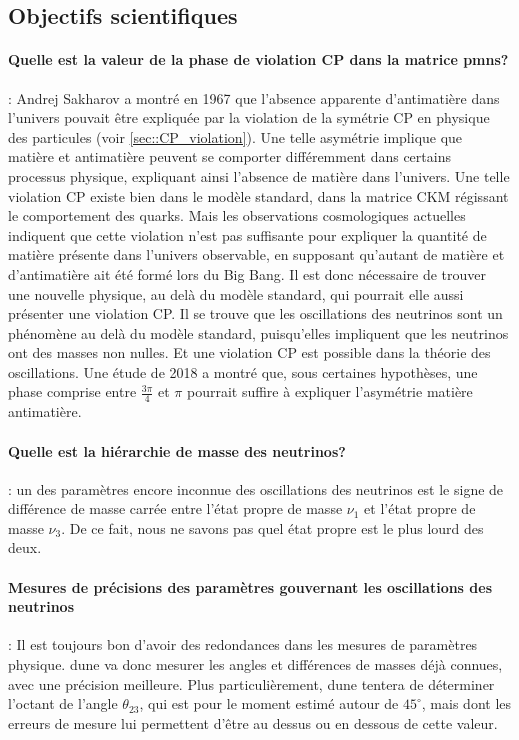         \subsection{Objectifs scientifiques}
        
            \paragraph{Quelle est la valeur de la phase de violation CP dans la matrice \gls{pmns}?} : Andrej Sakharov a montré en 1967\cite{Sakharov1967} que l'absence apparente d'antimatière dans l'univers pouvait être expliquée par la violation de la symétrie CP en physique des particules (voir \autoref{sec::CP_violation}). Une telle asymétrie implique que matière et antimatière peuvent se comporter différemment dans certains processus physique, expliquant ainsi l'absence de matière dans l'univers. Une telle violation CP existe bien dans le modèle standard, dans la matrice CKM régissant le comportement des quarks. Mais les observations cosmologiques actuelles\cite{Bari2012} indiquent que cette violation n'est pas suffisante pour expliquer la quantité de matière présente dans l'univers observable, en supposant qu'autant de matière et d'antimatière ait été formé lors du Big Bang. Il est donc nécessaire de trouver une nouvelle physique, au delà du modèle standard, qui pourrait elle aussi présenter une violation CP. Il se trouve que les oscillations des neutrinos sont un phénomène au delà du modèle standard, puisqu'elles impliquent que les neutrinos ont des masses non nulles. Et une violation CP est possible dans la théorie des oscillations. Une étude de 2018\cite{Bucella2018} a montré que, sous certaines hypothèses, une phase comprise entre $\frac{3\pi}{4}$ et $\pi$ pourrait suffire à expliquer l'asymétrie matière antimatière.
            
            \paragraph{Quelle est la hiérarchie de masse des neutrinos?} : un des paramètres encore inconnue des oscillations des neutrinos est le signe de différence de masse carrée entre l'état propre de masse $\nu_1$ et l'état propre de masse $\nu_3$. De ce fait, nous ne savons pas quel état propre est le plus lourd des deux.
            
            \paragraph{Mesures de précisions des paramètres gouvernant les oscillations des neutrinos} : Il est toujours bon d'avoir des redondances dans les mesures de paramètres physique. \gls{dune} va donc mesurer les angles et différences de masses déjà connues, avec une précision meilleure. Plus particulièrement, \gls{dune} tentera de déterminer l'octant de l'angle $\theta_{23}$, qui est pour le moment estimé autour de $45^{\circ}$, mais dont les erreurs de mesure lui permettent d'être au dessus ou en dessous de cette valeur\cite{citation_needed}.
            
